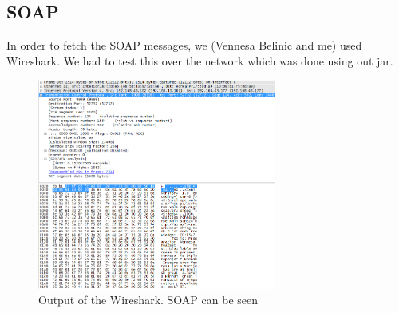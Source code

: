 \documentclass[12pt]{article}
\begin{document}
\subsection{SOAP}
In order to fetch the SOAP messages, we (Vennesa Belinic and me) used Wireshark. We had to test this over the network which was done using out jar.\FloatBarrier
\begin{figure}[here!]
\centering
\includegraphics[width=0.7\textwidth]{images/wireshark}
\caption{Output of the Wireshark. SOAP can be seen}
\end{figure}\FloatBarrier
\end{document}

